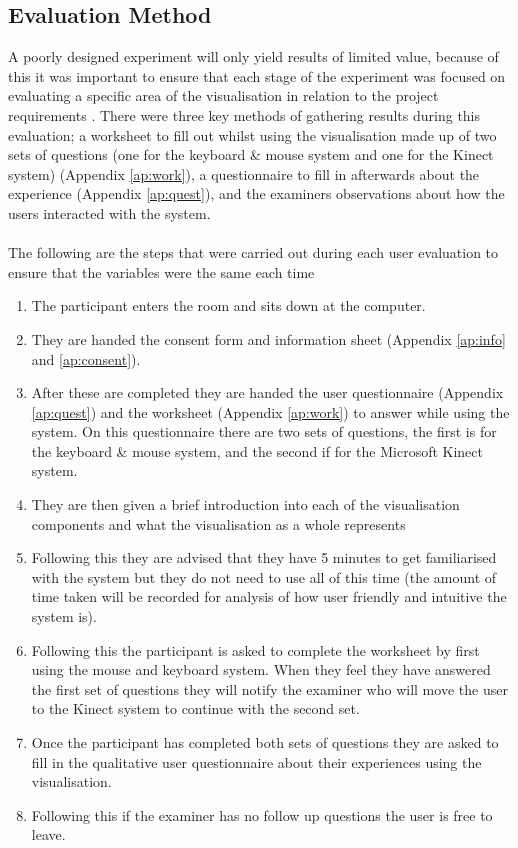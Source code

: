 \subsection{Evaluation Method}
A poorly designed experiment will only yield results of limited value, because
of this it was important to ensure that each stage of the experiment was
focused on evaluating a specific area of the visualisation in relation to the
project requirements \cite{stasko}. There were three key methods of gathering results during
this
evaluation; a
worksheet to fill out whilst using the visualisation made up of two sets of
questions (one for the keyboard \& mouse system and one for the Kinect
system) (Appendix \ref{ap:work}), a questionnaire to
fill in afterwards about the experience (Appendix \ref{ap:quest}), and the examiners
observations about
how the users interacted with the system.  
\\\\
The following are the steps that were carried out during each user evaluation to
ensure that the variables were the same each time
\begin{enumerate}
\item The participant enters the room and sits down at the computer.
\item They are handed the consent form and information sheet (Appendix \ref{ap:info} and \ref{ap:consent}).
\item After these are completed they are handed the user questionnaire (Appendix \ref{ap:quest}) and the
worksheet (Appendix \ref{ap:work}) to answer while using the system. On this questionnaire there
are two sets of questions, the first is for the keyboard \& mouse system, and
the second if for the Microsoft Kinect system.
\item They are then given a brief introduction into each of the visualisation
components and what the visualisation as a whole represents
\item Following this they are advised that they have 5 minutes to get
familiarised with the system but they do not need to use all of this time (the
amount of time taken will be recorded for analysis of how user friendly and
intuitive the system is).
\item Following this the participant is asked to complete the worksheet by first
using the mouse and keyboard system. When they feel they have answered the first
set of questions they will notify the examiner who will move the user to the
Kinect
system to continue with the second set.
\item Once the participant has completed both sets of questions they are asked
to fill
in the qualitative user questionnaire about their experiences using the
visualisation. 
\item Following this if the examiner has no follow up questions the user is free
to leave.
\end{enumerate}

